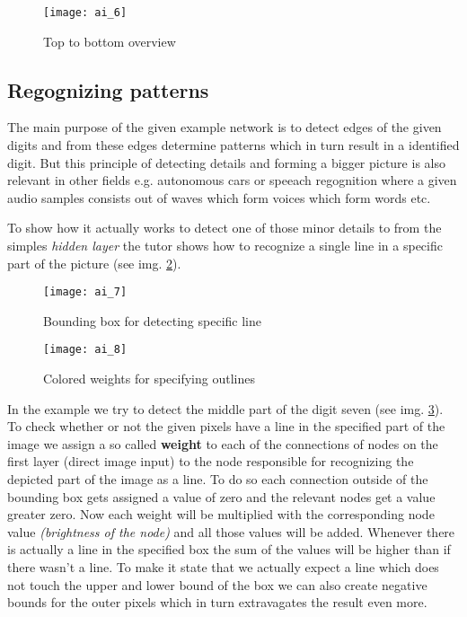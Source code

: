 \documentclass{article}
\begin{document}
\begin{figure}[h]
	\centering
	\texttt{[image: ai\_6]}
	\caption{Top to bottom overview}
	\label{ai_6}
\end{figure}


\subsection{Regognizing patterns}
The main purpose of the given example network is to detect edges of the given digits and from these edges determine patterns which in turn result in a identified digit. But this principle of detecting details and forming a bigger picture is also relevant in other fields e.g. autonomous cars or speeach regognition where a given audio samples consists out of waves which form voices which form words etc. 

To show how it actually works to detect one of those minor details to from the simples \textit{hidden layer} the tutor shows how to recognize a single line in a specific part of the picture (see img. \ref{ai_7}).

\begin{figure}[h]
	\centering
	\texttt{[image: ai\_7]}
	\caption{Bounding box for detecting specific line}
	\label{ai_7}
\end{figure}

\begin{figure}[h!]
	\centering
	\texttt{[image: ai\_8]}
	\caption{Colored weights for specifying outlines}
	\label{ai_8}
\end{figure}

In the example we try to detect the middle part of the digit seven (see img. \ref{ai_8}). To check whether or not the given pixels have a line in the specified part of the image we assign a so called \textbf{weight} to each of the connections of nodes on the first layer (direct image input) to the node responsible for recognizing the depicted part of the image as a line. To do so each connection outside of the bounding box gets assigned a value of zero and the relevant nodes get a value greater zero. Now each weight will be multiplied with the corresponding node value \textit{(brightness of the node)} and all those values will be added. Whenever there is actually a line in the specified box the sum of the values will be higher than if there wasn't a line. To make it state that we actually expect a line which does not touch the upper and lower bound of the box we can also create negative bounds for the outer pixels which in turn extravagates the result even more. 
\end{document}
